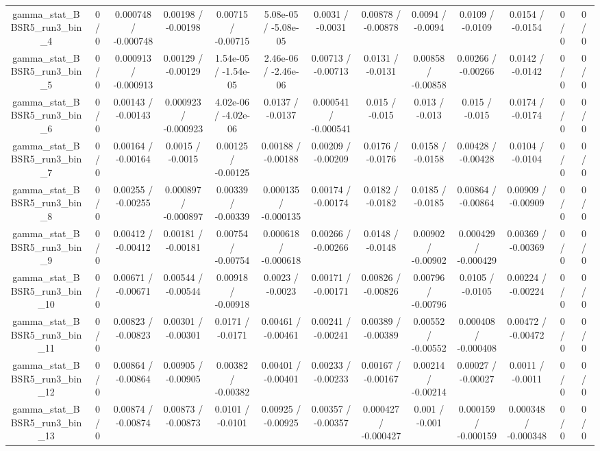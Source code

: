 \documentclass[10pt]{article}
\begin{document}
\begin{table}[htbp]
\begin{center}
\begin{tabular}{|c|c|c|c|c|c|c|c|c|c|c|c|c|}
  gamma_stat_BBSR5_run3_bin_4 & 0 / 0 & 0.000748 / -0.000748 & 0.00198 / -0.00198 & 0.00715 / -0.00715 & 5.08e-05 / -5.08e-05 & 0.0031 / -0.0031 & 0.00878 / -0.00878 & 0.0094 / -0.0094 & 0.0109 / -0.0109 & 0.0154 / -0.0154 & 0 / 0 & 0 / 0 \\ 
  gamma_stat_BBSR5_run3_bin_5 & 0 / 0 & 0.000913 / -0.000913 & 0.00129 / -0.00129 & 1.54e-05 / -1.54e-05 & 2.46e-06 / -2.46e-06 & 0.00713 / -0.00713 & 0.0131 / -0.0131 & 0.00858 / -0.00858 & 0.00266 / -0.00266 & 0.0142 / -0.0142 & 0 / 0 & 0 / 0 \\ 
  gamma_stat_BBSR5_run3_bin_6 & 0 / 0 & 0.00143 / -0.00143 & 0.000923 / -0.000923 & 4.02e-06 / -4.02e-06 & 0.0137 / -0.0137 & 0.000541 / -0.000541 & 0.015 / -0.015 & 0.013 / -0.013 & 0.015 / -0.015 & 0.0174 / -0.0174 & 0 / 0 & 0 / 0 \\ 
  gamma_stat_BBSR5_run3_bin_7 & 0 / 0 & 0.00164 / -0.00164 & 0.0015 / -0.0015 & 0.00125 / -0.00125 & 0.00188 / -0.00188 & 0.00209 / -0.00209 & 0.0176 / -0.0176 & 0.0158 / -0.0158 & 0.00428 / -0.00428 & 0.0104 / -0.0104 & 0 / 0 & 0 / 0 \\ 
  gamma_stat_BBSR5_run3_bin_8 & 0 / 0 & 0.00255 / -0.00255 & 0.000897 / -0.000897 & 0.00339 / -0.00339 & 0.000135 / -0.000135 & 0.00174 / -0.00174 & 0.0182 / -0.0182 & 0.0185 / -0.0185 & 0.00864 / -0.00864 & 0.00909 / -0.00909 & 0 / 0 & 0 / 0 \\ 
  gamma_stat_BBSR5_run3_bin_9 & 0 / 0 & 0.00412 / -0.00412 & 0.00181 / -0.00181 & 0.00754 / -0.00754 & 0.000618 / -0.000618 & 0.00266 / -0.00266 & 0.0148 / -0.0148 & 0.00902 / -0.00902 & 0.000429 / -0.000429 & 0.00369 / -0.00369 & 0 / 0 & 0 / 0 \\ 
  gamma_stat_BBSR5_run3_bin_10 & 0 / 0 & 0.00671 / -0.00671 & 0.00544 / -0.00544 & 0.00918 / -0.00918 & 0.0023 / -0.0023 & 0.00171 / -0.00171 & 0.00826 / -0.00826 & 0.00796 / -0.00796 & 0.0105 / -0.0105 & 0.00224 / -0.00224 & 0 / 0 & 0 / 0 \\ 
  gamma_stat_BBSR5_run3_bin_11 & 0 / 0 & 0.00823 / -0.00823 & 0.00301 / -0.00301 & 0.0171 / -0.0171 & 0.00461 / -0.00461 & 0.00241 / -0.00241 & 0.00389 / -0.00389 & 0.00552 / -0.00552 & 0.000408 / -0.000408 & 0.00472 / -0.00472 & 0 / 0 & 0 / 0 \\ 
  gamma_stat_BBSR5_run3_bin_12 & 0 / 0 & 0.00864 / -0.00864 & 0.00905 / -0.00905 & 0.00382 / -0.00382 & 0.00401 / -0.00401 & 0.00233 / -0.00233 & 0.00167 / -0.00167 & 0.00214 / -0.00214 & 0.00027 / -0.00027 & 0.0011 / -0.0011 & 0 / 0 & 0 / 0 \\ 
  gamma_stat_BBSR5_run3_bin_13 & 0 / 0 & 0.00874 / -0.00874 & 0.00873 / -0.00873 & 0.0101 / -0.0101 & 0.00925 / -0.00925 & 0.00357 / -0.00357 & 0.000427 / -0.000427 & 0.001 / -0.001 & 0.000159 / -0.000159 & 0.000348 / -0.000348 & 0 / 0 & 0 / 0 \\ 

\end{tabular}
\end{center}
\end{table}
\end{document}
